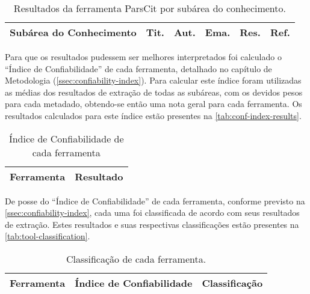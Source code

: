 \begin{table}
    \caption{Resultados da ferramenta ParsCit por subárea do conhecimento.}
    \begin{center}
        \begin{tabular}{|p{6cm}|C{1.2cm}|C{1.2cm}|C{1.2cm}|C{1.2cm}|C{1.2cm}|}
            \hline 
            \textbf{Subárea do Conhecimento} & \textbf{Tit.} & \textbf{Aut.} & \textbf{Ema.} & \textbf{Res.} & \textbf{Ref.} \\ \hline 
            
        \end{tabular}
    \end{center}
    \label{tab:results-parscit}
\end{table}


Para que os resultados pudessem ser melhores interpretados foi calculado o ``Índice de Confiabilidade'' de cada ferramenta, detalhado no capítulo de Metodologia (\autoref{ssec:confiability-index}). Para calcular este índice foram utilizadas as médias dos resultados de extração de todas as subáreas, com os devidos pesos para cada metadado, obtendo-se então uma nota geral para cada ferramenta. Os resultados calculados para este índice estão presentes na \autoref{tab:conf-index-results}.

\begin{table}
    \caption{Índice de Confiabilidade de cada ferramenta}
    \begin{center}
        \begin{tabular}{|p{3cm}|C{3cm}|}
            \hline 
            \textbf{Ferramenta} & \textbf{Resultado} \\ \hline 
            
        \end{tabular}
    \end{center}
    \label{tab:conf-index-results}
\end{table}

De posse do ``Índice de Confiabilidade'' de cada ferramenta, conforme previsto na \autoref{ssec:confiability-index}, cada uma foi classificada de acordo com seus resultados de extração. Estes resultados e suas respectivas classificações estão presentes na \autoref{tab:tool-classification}.

\begin{table}
    \caption{Classificação de cada ferramenta.}
    \begin{center}
        \begin{tabular}{|p{3cm}|C{5.5cm}|p{4cm}|}
            \hline 
            \textbf{Ferramenta} & \textbf{Índice de Confiabilidade} & \textbf{Classificação} \\ \hline 
            
        \end{tabular}
    \end{center}
    \label{tab:tool-classification}
\end{table}

